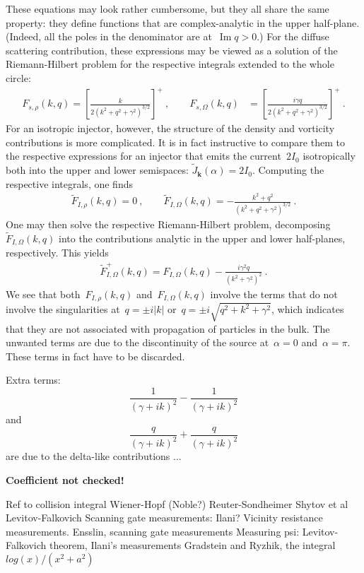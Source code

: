 \documentclass[preprint,aps,eqsecnum]{revtex4-1}
\newcommand{\fplus}[1]{{#1}^{+}}
\renewcommand{\Im}{\mathop{\mathrm{Im}}\nolimits}
\begin{document}
These equations may look rather cumbersome, but they all share the same
property: they define functions that are complex-analytic in the upper
half-plane. (Indeed, all the poles in the denominator are at~$\Im q > 0$.)
For the diffuse scattering contribution,
these expressions may be viewed as a solution of the
Riemann-Hilbert problem for the respective integrals
extended to the whole circle:
\begin{align}
  F_{s, \rho}(k, q)
  = \left[\frac{k}{2(k^2 + q^2 + \gamma^2)^{3/2}}\right]^{+}\ , 
  \qquad
  F_{s, \Omega}(k, q) &= \left[\frac{i \gamma q}{
          2\left(k^2 + q^2 + \gamma^2\right)^{3/2}}\right]^{+}\ . 
\end{align}
For an isotropic injector, however, the structure of the
density and vorticity contributions is more complicated.
It is in fact instructive to compare them to the respective expressions
for an injector that emits the current~$2I_0$ isotropically both into the
upper and lower semispaces: ${\tilde J}_{\bm k}(\alpha) = 2I_0$.
Computing the respective integrals, one finds
\begin{align}
  {\tilde F}_{I, \rho}(k, q) = 0 \ , \qquad
  {\tilde F}_{I, \Omega}(k, q)
  = - \frac{k^2 + q^2}{(k^2 + q^2 + \gamma^2)^{3/2}}\ . 
\end{align}
One may then solve the respective Riemann-Hilbert problem,
decomposing~${\tilde F}_{I, \Omega}(k, q)$
into the contributions analytic in the upper and lower half-planes,
respectively. This yields
\begin{align}
  \fplus{\tilde{F}}_{I, \Omega}(k, q) = F_{I, \Omega}(k, q)
  - \frac{i \gamma^2 q}{(k^2 + \gamma^2)^2}\ . 
\end{align}
We see that both~$F_{I, \rho}(k, q)$ and~$F_{I, \Omega}(k, q)$
involve the terms that do not involve the singularities
at~$q = \pm i |k|$ or~$q = \pm i\sqrt{q^2 + k^2 + \gamma^2}$,
which indicates that they are not associated with propagation
of particles in the bulk. The unwanted terms are due to
the discontinuity of the source at~$\alpha = 0$ and~$\alpha = \pi$.
These terms in fact have to be discarded. 


Extra terms:
$$
\frac{1}{(\gamma + i k)^2}
- \frac{1}{(\gamma + i k)^2}
$$
and
$$
\frac{q}{(\gamma + i k)^2}
+ \frac{q}{(\gamma + i k)^2}
$$
are due to the delta-like contributions ... 


\textbf{Coefficient not checked!}

\begin{thebibliography}{99}
 Ref to collision integral
 Wiener-Hopf (Noble?)
 Reuter-Sondheimer
 Shytov et al
 Levitov-Falkovich
 Scanning gate measurements: Ilani?
 Vicinity resistance measurements.
 Ensslin, scanning gate measurements
 Measuring psi: Levitov-Falkovich theorem,
  Ilani's measurements
 Gradstein and Ryzhik, the integral $log(x)/(x^2 + a^2)$
\end{thebibliography}
\end{document}
